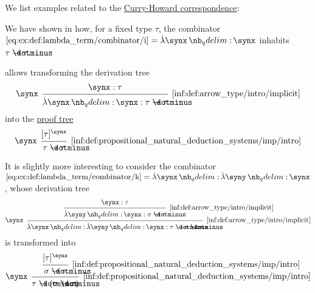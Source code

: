 \begin{example}\label{ex:con:curry_howard_correspondence}
  We list examples related to the \hyperref[con:curry_howard_correspondence]{Curry-Howard correspondence}:
  \begin{thmenum}
     We have shown in  how, for a fixed type \( \tau \), the combinator \( \ref{eq:ex:def:lambda_term/combinator/i} = \qabs \synx \synx \) inhabits \( \tau \synimplies \tau \).

     allows transforming the derivation tree
    \begin{equation*}
      \begin{prooftree}
        \hypo{ \synx: \tau }
        \infer[left label=\( \synx \)]1[\ref{inf:def:arrow_type/intro/implicit}]{ \qabs \synx \synx: \tau \synimplies \tau }
      \end{prooftree}
    \end{equation*}
    into the \hyperref[def:natural_deduction_proof_tree]{proof tree}
    \begin{equation*}
      \begin{prooftree}
        \hypo{ [\tau]^\synx }
        \infer[left label=\( \synx \)]1[\ref{inf:def:propositional_natural_deduction_systems/imp/intro}]{ \tau \synimplies \tau }
      \end{prooftree}
    \end{equation*}

    It is slightly more interesting to consider the combinator \( \ref{eq:ex:def:lambda_term/combinator/k} = \qabs \synx \qabs \syny \synx \), whose derivation tree
    \begin{equation*}
      \begin{prooftree}
        \hypo{ \synx: \tau }
        \infer1[\ref{inf:def:arrow_type/intro/implicit}]{ \qabs \syny \synx: \sigma \synimplies \tau }
        \infer[left label=\( \synx \)]1[\ref{inf:def:arrow_type/intro/implicit}]{ \qabs \synx \qabs \syny \synx: \tau \synimplies \sigma \synimplies \tau }
      \end{prooftree}
    \end{equation*}
    is transformed into
    \begin{equation*}
      \begin{prooftree}
        \hypo{ [\tau]^\synx }
        \infer1[\ref{inf:def:propositional_natural_deduction_systems/imp/intro}]{ \sigma \synimplies \tau }
        \infer[left label=\( \synx \)]1[\ref{inf:def:propositional_natural_deduction_systems/imp/intro}]{ \tau \synimplies (\sigma \synimplies \tau) }
      \end{prooftree}
    \end{equation*}


\end{thmenum}
\end{example}
